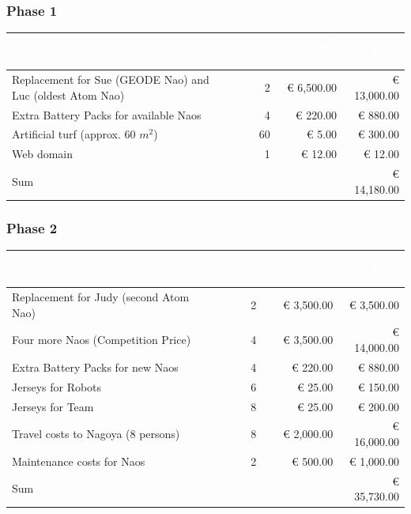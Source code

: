 \documentclass[12pt]{article}
\theoremstyle{definition}
\begin{document}
\subsubsection{Phase 1}
\begin{tabular}{|p{.6\linewidth}|r|r|r|}
\hline
\cellcolor[gray]{0.5}\textcolor{white}{Text} & \cellcolor[gray]{0.45}\textcolor{white}{Count} & \cellcolor[gray]{0.5}\textcolor{white}{Single Price} & \cellcolor[gray]{0.45}\textcolor{white}{Total} \\ \hline
Replacement for Sue (GEODE Nao) and Luc (oldest Atom Nao) & 2 & \euro{} 6,500.00 & \euro{} 13,000.00\\ \hline
Extra Battery Packs for available Naos & 4 & \euro{} 220.00 & \euro{} 880.00 \\ \hline
Artificial turf (approx. 60 $m^2$) & 60 & \euro{} 5.00 & \euro{} 300.00 \\ \hline
Web domain & 1 & \euro{} 12.00 & \euro{} 12.00 \\ \hline
Sum &  &  & \euro{} 14,180.00 \\ \hline
\end{tabular}

\subsubsection{Phase 2}
\begin{tabular}{|p{.6\linewidth}|r|r|r|}
\hline
\cellcolor[gray]{0.5}\textcolor{white}{Text} & \cellcolor[gray]{0.45}\textcolor{white}{Count} & \cellcolor[gray]{0.5}\textcolor{white}{Single Price} & \cellcolor[gray]{0.45}\textcolor{white}{Total} \\ \hline
Replacement for Judy (second Atom Nao) & 2 & \euro{} 3,500.00 & \euro{} 3,500.00\\ \hline
Four more Naos (Competition Price) & 4 & \euro{} 3,500.00 & \euro{} 14,000.00 \\ \hline
Extra Battery Packs for new Naos & 4 & \euro{} 220.00 & \euro{} 880.00 \\ \hline
Jerseys for Robots & 6 & \euro{} 25.00 & \euro{} 150.00 \\ \hline
Jerseys for Team & 8 & \euro{} 25.00 & \euro{} 200.00 \\ \hline
Travel costs to Nagoya (8 persons) & 8 & \euro{} 2,000.00 & \euro{} 16,000.00 \\ \hline
Maintenance costs for Naos & 2 & \euro{} 500.00 & \euro{} 1,000.00 \\ \hline
Sum &  &  & \euro{} 35,730.00 \\ \hline
\end{tabular}

{}
\end{document}
